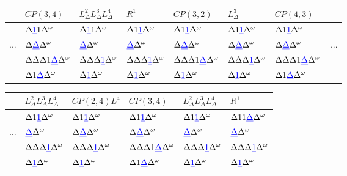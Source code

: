 \documentclass[11pt,a4paper]{article}
\newcommand{\blue}[1]{\textcolor{blue}{#1}}
\newcommand{\D}{\Delta}
\newcommand{\EOT}{\Delta^\omega} %
\newcommand{\UL}[1]{\blue{\underbar{$#1$}}} %
\begin{document}
\begin{center}
  \begin{tabular}{r|l|l|l|l|l|l|l}
        &\tiny{$CP(3,4)$}          & \tiny{$L^2_\D L^3_\D L^4_\D$} & \tiny{$R^1$}           & \tiny{$CP(3,2)$}          & \tiny{$L^3_\D$}        & \tiny{$CP(4,3)$}          & \\\hline
        &$\D \UL{1} 1 \EOT$        & $\D \UL{1} 1 \EOT$            & $\D 1 \UL{1} \EOT$     & $\D 1 \UL{1} \EOT$        & $\D 1 \UL{1} \EOT$     & $\D 1 \UL{1} \EOT$        & \\
    ... &$\D \UL{\D} \EOT$         & $\UL{\D} \EOT$                & $\UL{\D} \EOT$         & $\D \UL{\D} \EOT$         & $\D \UL{\D} \EOT$      & $\D \UL{\D} \EOT$         & ... \\
        &$\D \D \D 1 \UL{\D} \EOT$ & $\D \D \D \UL{1} \EOT$        & $\D \D \D \UL{1} \EOT$ & $\D \D \D 1 \UL{\D} \EOT$ & $\D \D \D \UL{1} \EOT$ & $\D \D \D 1 \UL{\D} \EOT$ & \\
        &$\D 1 \UL{\D} \EOT$       & $\D \UL{1} \EOT$              & $\D \UL{1} \EOT$       & $\D \UL{1} \EOT$          & $\D \UL{1} \EOT$       & $\D 1 \UL{\D} \EOT$       & \\
  \end{tabular}
\end{center}

\begin{flushright}
  \begin{tabular}{r|l|l|l|l|l}
        & \tiny{$L^2_\D L^3_\D L^4_\D$} & \tiny{$CP(2,4)L^4$}    & \tiny{$CP(3,4)$}          & \tiny{$L^2_\D L^3_\D L^4_\D$} & \tiny{$R^1$}           \\\hline
        & $\D 1 \UL{1} \EOT$            & $\D 1 \UL{1} \EOT$     & $\D 1 \UL{1} \EOT$        & $\D 1 \UL{1} \EOT$            & $\D 1 1 \UL{\D} \EOT$  \\
    ... & $\UL{\D} \EOT$                & $\D \UL{\D} \EOT$      & $\D \UL{\D} \EOT$         & $\UL{\D} \EOT$                & $\UL{\D} \EOT$         \\
        & $\D \D \D \UL{1} \EOT$        & $\D \D \D \UL{1} \EOT$ & $\D \D \D 1 \UL{\D} \EOT$ & $\D \D \D \UL{1} \EOT$        & $\D \D \D \UL{1} \EOT$ \\
        & $\D \UL{1} \EOT$              & $\D \UL{1} \EOT$       & $\D 1 \UL{\D} \EOT$       & $\D \UL{1} \EOT$              & $\D \UL{1} \EOT$       \\
  \end{tabular}
\end{flushright}
\end{document}
